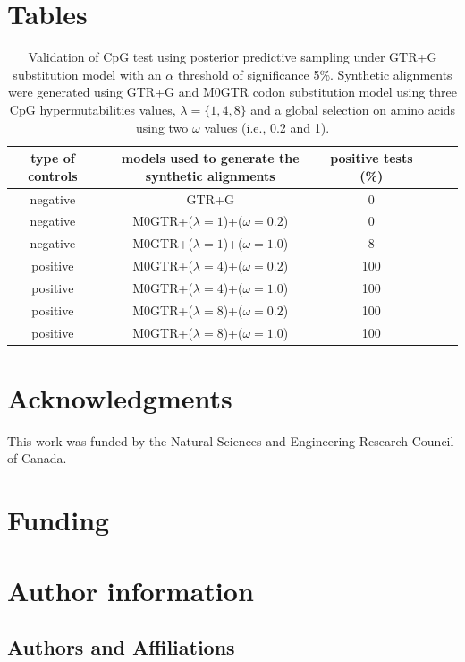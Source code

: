 \documentclass{article}
\begin{document}
\newpage
\section*{Tables}

\begin{table}[h]
    \begin{tabular}{cccccc}
    type of controls & models used to generate the synthetic alignments & positive tests (\%)\\
    \hline
    negative & GTR+G                              & 0\\
    negative & M0GTR+($\lambda=1$)+($\omega=0.2$) & 0\\
    negative & M0GTR+($\lambda=1$)+($\omega=1.0$) & 8\\
    positive & M0GTR+($\lambda=4$)+($\omega=0.2$) & 100\\
    positive & M0GTR+($\lambda=4$)+($\omega=1.0$) & 100\\
    positive & M0GTR+($\lambda=8$)+($\omega=0.2$) & 100\\
    positive & M0GTR+($\lambda=8$)+($\omega=1.0$) & 100\\
    \hline
    \end{tabular}
    \caption{Validation of CpG test using posterior predictive sampling under GTR+G substitution model with an $\alpha$ threshold of significance 5\%. Synthetic alignments were generated using GTR+G and M0GTR codon substitution model using three CpG hypermutabilities values, $\lambda = \{1,4,8\}$ and a global selection on amino acids using two $\omega$ values (i.e., 0.2 and 1).}\label{table_1}
\end{table}
\newpage


\newpage
\section*{Acknowledgments}
This work was funded by the Natural Sciences and Engineering Research Council of Canada.
\section*{Funding}
\section*{Author information}
\subsection*{Authors and Affiliations}
\end{document}
